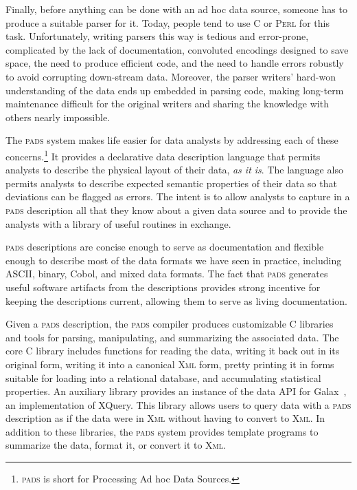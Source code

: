 \documentclass{sigplanconf}
\newcommand{\pads}{\textsc{pads}}
\newcommand{\C}{\textsc{C}}
\newcommand{\perl}{\textsc{Perl}}
\newcommand{\xml}{\textsc{Xml}}
\begin{document}
Finally, before anything can be done with an ad hoc data source,
someone has to produce a suitable parser for it.
Today, people tend to use \C{} or \perl{} for this task.
Unfortunately, writing
parsers this way is tedious and error-prone, complicated by the lack
of documentation, convoluted encodings designed to save space, 
the need to produce efficient code,
and the need to handle errors robustly to avoid corrupting down-stream data.
Moreover, the parser writers' hard-won understanding of the data
ends up embedded in parsing code, making long-term maintenance
difficult for the original writers and sharing the knowledge with
others nearly impossible.

The \pads{} system makes life easier for data analysts by addressing
each of these concerns.\footnote{
  \pads{} is short for Processing Ad hoc Data Sources.
}
It provides a declarative data description
language that permits analysts to describe the physical layout of
their data, \textit{as it is}.  The language also permits analysts to
describe expected semantic properties of their data so that deviations can
be flagged as errors. The intent is to allow analysts to capture in a
\pads{} description all that they know about a given data source
and to provide the analysts with a library of useful routines in exchange. 


\pads{} descriptions are concise enough to
serve as documentation and flexible enough to describe most of
the data formats we have seen in practice, including ASCII, binary,
Cobol, and mixed data formats.  The fact that \pads{} generates useful software
artifacts from the descriptions provides strong
incentive for keeping the descriptions current, allowing them to serve
as living documentation.  

Given a \pads{} description, the \pads{} compiler produces customizable \C{} libraries
and tools for parsing, manipulating, and summarizing the associated data. 
The core \C{} library includes functions for reading the data, writing it 
back out in its original form, writing it into a canonical \xml{} form, pretty printing
it in forms suitable for loading into a relational database, and accumulating  
statistical properties.  An auxiliary library provides 
an instance of the data API for Galax~\cite{galaxmanual,galax}, an implementation of XQuery.  This 
library allows users to query data with a \pads{} description as if the data were
in \xml{} without having to convert to \xml{}.  In addition to these libraries,
the \pads{} system provides template programs to 
summarize the data, format it, or convert it to \xml{}.
\end{document}
